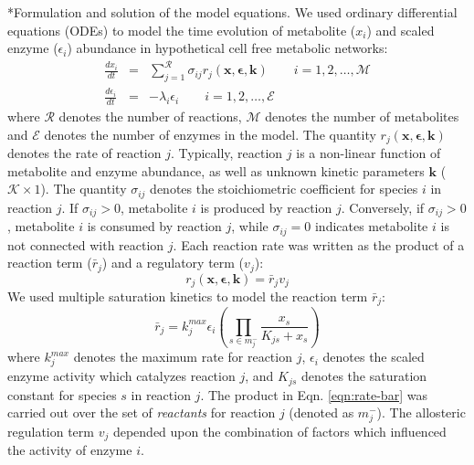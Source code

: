 \documentclass[12pt]{article}
\makeatletter
\renewcommand\subsection{\@startsection
	{subsection}{2}{0mm}
	{-0.05in}
	{-0.5\baselineskip}
	{\normalfont\normalsize\bfseries}}
\makeatother
\begin{document}
\subsection*{Formulation and solution of the model equations.}
We used ordinary differential equations (ODEs) to model the time evolution of metabolite ($x_{i}$) and scaled enzyme ($\epsilon_{i}$) abundance in hypothetical cell free
metabolic networks:
\begin{eqnarray}
	\frac{dx_{i}}{dt} & = & \sum_{j = 1}^{\mathcal{R}}\sigma_{ij}r_{j}\left(\mathbf{x},\mathbf{\epsilon},\mathbf{k}\right)\qquad{i=1,2,\hdots,\mathcal{M}}\\
	\frac{d\epsilon_{i}}{dt} & = & -\lambda_{i}\epsilon_{i}\qquad{i = 1,2,\hdots,\mathcal{E}}
\end{eqnarray}where $\mathcal{R}$ denotes the number of reactions, $\mathcal{M}$ denotes the number of metabolites and $\mathcal{E}$ denotes the number of
enzymes in the model. The quantity $r_{j}\left(\mathbf{x},\mathbf{\epsilon},\mathbf{k}\right)$ 
denotes the rate of reaction $j$. Typically, reaction $j$ is a non-linear function of metabolite and enzyme abundance, as well as unknown kinetic parameters 
$\mathbf{k}$ ($\mathcal{K}\times{1}$).
The quantity $\sigma_{ij}$ denotes the stoichiometric coefficient for species $i$ in reaction $j$. If 
$\sigma_{ij}>0$, metabolite $i$ is produced by reaction $j$. Conversely, if $\sigma_{ij}>0$, metabolite $i$ is consumed by reaction $j$, while $\sigma_{ij} = 0$ indicates
metabolite $i$ is not connected with reaction $j$. 
Each reaction rate was written as the product of a reaction term ($\bar{r}_{j}$) and a regulatory term ($v_{j}$):
\begin{equation}
	r_{j}\left(\mathbf{x},\mathbf{\epsilon},\mathbf{k}\right) = \bar{r}_{j}v_{j}
\end{equation}We used multiple saturation kinetics to model the reaction term $\bar{r}_{j}$:
\begin{equation}\label{eqn:rate-bar}
	\bar{r}_{j} = k_{j}^{max}\epsilon_{i}\left(\prod_{s\in{m_{j}^{-}}}\frac{x_{s}}{K_{js} + x_{s}}\right)
\end{equation}where $k_{j}^{max}$ denotes the maximum rate for reaction $j$, $\epsilon_{i}$ denotes the scaled enzyme activity which catalyzes reaction $j$, and
$K_{js}$ denotes the saturation constant for species $s$ in reaction $j$. 
The product in Eqn. \eqref{eqn:rate-bar} was carried out over the set of \textit{reactants} for reaction $j$ (denoted as $m_{j}^{-}$). 
The allosteric regulation term $v_{j}$ depended upon the combination of factors which influenced the activity of enzyme $i$.
\end{document}
